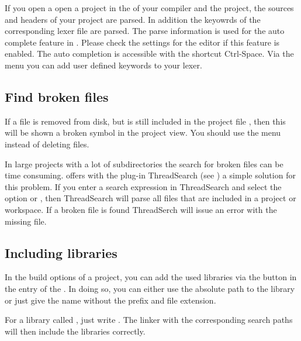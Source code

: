 If you open a open a project in \codeblocks the  of your compiler and the project, the sources and headers of your project are parsed. In addition the keyowrds of the corresponding lexer file are parsed. The parse information is used for the auto complete feature in \codeblocks. Please check the settings for the editor if this feature is enabled. The auto completion is accessible with the shortcut Ctrl-Space. Via the menu  you can add user defined keywords to your lexer.

\subsection{Find broken files}

If a file is removed from disk, but is still included in the project file , then this  will be shown a broken symbol in the project view. You should use the menu  instead of deleting files.

In large projects with a lot of subdirectories the search for broken files can be time consuming. \codeblocks offers with the plug-in ThreadSearch (see ) a simple solution for this problem. If you enter a search expression in ThreadSearch and select the option  or , then ThreadSearch will parse all files that are included in a project or workspace. If a broken file is found ThreadSerch will issue an error with the missing file.

\subsection{Including libraries}

In the build options of a project, you can add the used libraries via the  button in the  entry of the . In doing so, you can either use the absolute path to the library or just give the name without the  prefix and file extension.


For a library called , just write . The linker with the corresponding search paths will then include the libraries correctly.


